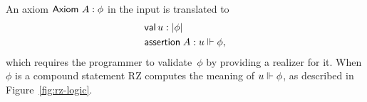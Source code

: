 An axiom $\mathsf{Axiom}\ A : \phi$ in the input is translated to
%
\begin{align*}
  & \mathsf{val}\,u:|\phi| \\
  & \mathsf{assertion}\; A : u \Vdash \phi,
\end{align*}
%
which requires the programmer to validate~$\phi$ by providing a
realizer for it. When $\phi$ is a compound statement RZ computes the
meaning of $u \Vdash \phi$, as described in Figure~\ref{fig:rz-logic}.



